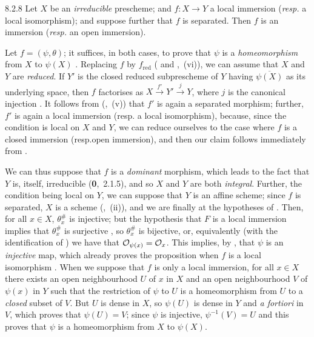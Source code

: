 \begin{env}[Proposition]{8.2.8}
\label{prop-1.8.2.8}
Let $X$ be an \emph{irreducible} prescheme; and
$f\colon X\to Y$ a local immersion (\emph{resp.} a local isomorphism); and
suppose further that $f$ is separated. Then $f$ is an immersion (\emph{resp.}
an open immersion).
\end{env}

Let $f=(\psi,\theta)$; it suffices, in both cases, to prove that $\psi$ is a
\emph{homeomorphism} from $X$ to $\psi(X)$ . Replacing $f$ by
$f_\mathrm{red}$ ( and ,~(vi)), we can assume that $X$
and $Y$ are \emph{reduced}. If $Y'$ is the closed reduced subprescheme of $Y$
having $\overline{\psi(X)}$ as its underlying space, then $f$ factorises as
$X\xrightarrow{f'}Y'\xrightarrow{j}Y$, where $j$ is the canonical injection
. It follows from (,~(v)) that $f'$ is again a
separated morphism; further, $f'$ is again a local immersion (resp.
a local isomorphism), because, since the condition is local on $X$ and $Y$, we
can reduce ourselves to the case where $f$ is a closed immersion (resp.open
immersion), and then our claim follows immediately from .

We can thus suppose that $f$ is a \emph{dominant} morphism, which leads to the
fact that $Y$ is, itself, irreducible (\textbf{0},~2.1.5), and so $X$ and $Y$
are both \emph{integral}. Further, the condition being local on $Y$, we can
suppose that $Y$ is an affine scheme; since $f$ is separated, $X$ is a scheme
(,~(ii)), and we are finally at the hypotheses of .
Then, for all $x\in X$, $\theta_x^\#$ is injective; but the hypothesis that $F$
is a local immersion implies that $\theta_x^\#$ is surjective , so
$\theta_x^\#$ is bijective, or, equivalently (with the identification of
) we have that $\mathcal{O}_{\psi(x)}=\mathcal{O}_x$. This implies, by ,
that $\psi$ is an \emph{injective} map, which already proves the proposition
when $f$ is a local isomorphism . When we suppose that $f$ is only
a local immersion, for all $x\in X$ there exists an open neighbourhood $U$ of
$x$ in $X$ and an open neighbourhood $V$ of $\psi(x)$ in $Y$ such that the
restriction of $\psi$ to $U$ is a homeomorphism from $U$ to a \emph{closed}
subset of $V$. But $U$ is dense in $X$, so $\psi(U)$ is dense in $Y$ and
\emph{a fortiori} in $V$, which proves that $\psi(U)=V$; since $\psi$ is
injective, $\psi^{-1}(V)=U$ and this proves that $\psi$ is a homeomorphism from
$X$ to $\psi(X)$.

